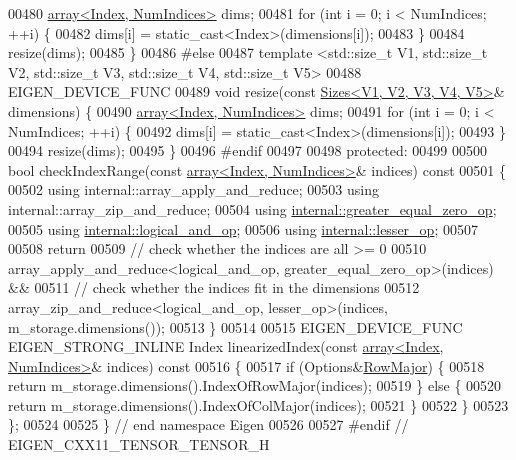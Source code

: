 \begin{DoxyCode}
00480       \hyperlink{class_eigen_1_1array}{array<Index, NumIndices>} dims;
00481       \textcolor{keywordflow}{for} (\textcolor{keywordtype}{int} i = 0; i < NumIndices; ++i) \{
00482         dims[i] = \textcolor{keyword}{static\_cast<}Index\textcolor{keyword}{>}(dimensions[i]);
00483       \}
00484       resize(dims);
00485     \}
00486 \textcolor{preprocessor}{#else}
00487     \textcolor{keyword}{template} <std::\textcolor{keywordtype}{size\_t} V1, std::\textcolor{keywordtype}{size\_t} V2, std::\textcolor{keywordtype}{size\_t} V3, std::\textcolor{keywordtype}{size\_t} V4, std::\textcolor{keywordtype}{size\_t} V5>
00488     EIGEN\_DEVICE\_FUNC
00489     \textcolor{keywordtype}{void} resize(\textcolor{keyword}{const} \hyperlink{struct_eigen_1_1_sizes}{Sizes<V1, V2, V3, V4, V5>}& dimensions) \{
00490       \hyperlink{class_eigen_1_1array}{array<Index, NumIndices>} dims;
00491       \textcolor{keywordflow}{for} (\textcolor{keywordtype}{int} i = 0; i < NumIndices; ++i) \{
00492         dims[i] = \textcolor{keyword}{static\_cast<}Index\textcolor{keyword}{>}(dimensions[i]);
00493       \}
00494       resize(dims);
00495     \}
00496 \textcolor{preprocessor}{#endif}
00497 
00498   \textcolor{keyword}{protected}:
00499 
00500     \textcolor{keywordtype}{bool} checkIndexRange(\textcolor{keyword}{const} \hyperlink{class_eigen_1_1array}{array<Index, NumIndices>}& indices)\textcolor{keyword}{ const}
00501 \textcolor{keyword}{    }\{
00502       \textcolor{keyword}{using} internal::array\_apply\_and\_reduce;
00503       \textcolor{keyword}{using} internal::array\_zip\_and\_reduce;
00504       \textcolor{keyword}{using} \hyperlink{struct_eigen_1_1internal_1_1greater__equal__zero__op}{internal::greater\_equal\_zero\_op};
00505       \textcolor{keyword}{using} \hyperlink{struct_eigen_1_1internal_1_1logical__and__op}{internal::logical\_and\_op};
00506       \textcolor{keyword}{using} \hyperlink{struct_eigen_1_1internal_1_1lesser__op}{internal::lesser\_op};
00507 
00508       \textcolor{keywordflow}{return}
00509         \textcolor{comment}{// check whether the indices are all >= 0}
00510         array\_apply\_and\_reduce<logical\_and\_op, greater\_equal\_zero\_op>(indices) &&
00511         \textcolor{comment}{// check whether the indices fit in the dimensions}
00512         array\_zip\_and\_reduce<logical\_and\_op, lesser\_op>(indices, m\_storage.dimensions());
00513     \}
00514 
00515     EIGEN\_DEVICE\_FUNC EIGEN\_STRONG\_INLINE Index linearizedIndex(\textcolor{keyword}{const} 
      \hyperlink{class_eigen_1_1array}{array<Index, NumIndices>}& indices)\textcolor{keyword}{ const}
00516 \textcolor{keyword}{    }\{
00517       \textcolor{keywordflow}{if} (Options&\hyperlink{group__enums_ggaacded1a18ae58b0f554751f6cdf9eb13acfcde9cd8677c5f7caf6bd603666aae3}{RowMajor}) \{
00518         \textcolor{keywordflow}{return} m\_storage.dimensions().IndexOfRowMajor(indices);
00519       \} \textcolor{keywordflow}{else} \{
00520         \textcolor{keywordflow}{return} m\_storage.dimensions().IndexOfColMajor(indices);
00521       \}
00522     \}
00523 \};
00524 
00525 \} \textcolor{comment}{// end namespace Eigen}
00526 
00527 \textcolor{preprocessor}{#endif // EIGEN\_CXX11\_TENSOR\_TENSOR\_H}
\end{DoxyCode}
